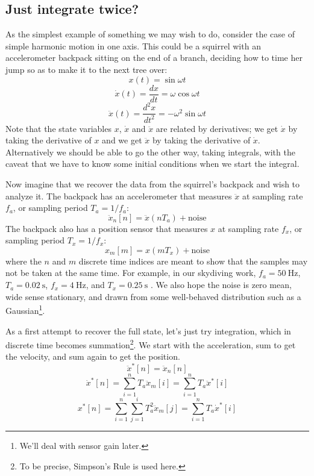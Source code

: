 \documentclass{amsart}
\begin{document}
\subsection{Just integrate twice?}
As the simplest example of something we may wish to do, consider the case of simple harmonic motion in one axis.  This could be a squirrel with an accelerometer backpack sitting on the end of a branch, deciding how to time her jump so as to make it to the next tree over: 
\begin{equation}
x(t) = \sin{\omega t}
\end{equation}
\begin{equation}
\dot{x}(t) = \frac{dx}{dt} = \omega\cos{\omega t}
\end{equation}
\begin{equation}
\ddot{x}(t) = \frac{d^2x}{dt^2} = -\omega^2\sin{\omega t}
\end{equation}
Note that the state variables $x$, $\dot{x}$ and $\ddot{x}$ are related by derivatives; we get $\dot{x}$ by taking the derivative of $x$ and we get $\ddot{x}$ by taking the derivative of $\dot{x}$.  Alternatively we should be able to go the other way, taking integrals, with the caveat that we have to know some initial conditions when we start the integral.   

Now imagine that we recover the data from the squirrel's backpack and wish to analyze it.  The backpack has an accelerometer that measures $\ddot{x}$ at sampling rate $f_a$, or sampling period $T_a=1/f_a$:
\begin{equation}
\ddot{x}_n [n] = \ddot{x}(n T_a) + \mbox{noise}
\end{equation}
The backpack also has a position sensor that measures $x$ at sampling rate $f_x$, or sampling period $T_x=1/f_x$:
\begin{equation}
x_{m}[m] = {x}(m T_x) + \mbox{noise}
\end{equation}
where the $n$ and $m$ discrete time indices are meant to show that the samples may not be taken at the same time.  For example, in our skydiving work, $f_a=\SI{50}{\hertz}$, $T_a=\SI{0.02}{\second}$, $f_x=\SI{4}{\hertz}$, and $T_x=\SI{0.25}{\second}$ \cite{Cardona:2011, Evangelista:2012}.  We also hope the noise is zero mean, wide sense stationary, and drawn from some well-behaved distribution such as a Gaussian\footnote{We'll deal with sensor gain later.}. 

As a first attempt to recover the full state, let's just try integration, which in discrete time becomes summation\footnote{To be precise, Simpson's Rule is used here.}.  We start with the acceleration, sum to get the velocity, and sum again to get the position.  
\begin{equation}
\ddot{x}^*[n] = \ddot{x}_n[n]
\end{equation}
\begin{equation}
\dot{x}^*[n] = \sum_{i=1}^n T_a \ddot{x}_m[i] = \sum_{i=1}^n T_a \ddot{x}^*[i]
\end{equation}
\begin{equation}
x^*[n] = \sum_{i=1}^n \sum_{j=1}^i T_a^2 \ddot{x}_m[j] = \sum_{i=1}^n T_a \dot{x}^*[i]
\end{equation}
\end{document}
